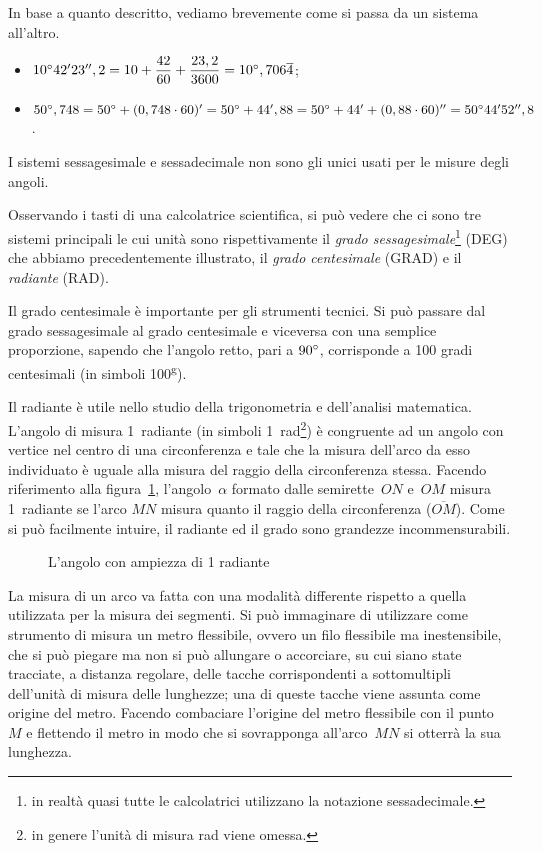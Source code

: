 In base a quanto descritto, vediamo brevemente come si passa da un sistema all'altro.

\begin{itemize}
\item $10{}^{\circ} 42' 23'',2 = 10+\dfrac{42}{60}+\dfrac{23,2}{3600} = 10{}^{\circ},706\overline{4}$;
\item $50{}^{\circ},748 = 50{}^{\circ} + (0,748\cdot 60)'=50{}^{\circ} + 44',88 = 50{}^{\circ} + 44'+(0,88\cdot 60)'' = 50{}^{\circ} 44' 52'',8$.
\end{itemize}

I sistemi sessagesimale e sessadecimale non sono gli unici usati per le misure degli angoli.

Osservando i tasti di una calcolatrice scientifica, si può vedere che ci sono tre sistemi principali le cui unità sono rispettivamente il \emph{grado sessagesimale}\footnote{in realtà quasi tutte le calcolatrici utilizzano la notazione sessadecimale.} (DEG) che abbiamo precedentemente illustrato, il \emph{grado centesimale} (GRAD) e il \emph{radiante} (RAD).

Il grado centesimale è importante per gli strumenti tecnici. Si può passare dal grado sessagesimale al grado centesimale e viceversa con una semplice proporzione, sapendo che l'angolo retto, pari a $90{}^{\circ}$, corrisponde a 100 gradi centesimali (in simboli 100\textsuperscript{g}).

Il radiante è utile nello studio della trigonometria e dell'analisi matematica. L'angolo di misura 1~radiante (in simboli 1~rad\footnote{in genere l'unità di misura rad viene omessa.}) è congruente ad un angolo con vertice nel centro di una circonferenza e tale che la misura dell'arco da esso individuato è uguale alla misura del raggio della circonferenza stessa.
Facendo riferimento alla figura~\ref{fig:radiante}, l'angolo~$\alpha$ formato dalle semirette~$ON$ e~$OM$ misura 1~radiante se l'arco $MN$ misura quanto il raggio della circonferenza ($\overline{OM}$). Come si può facilmente intuire, il radiante ed il grado sono grandezze incommensurabili.

\begin{figure}[htb]
\centering
\caption{L'angolo con ampiezza di 1 radiante}\label{fig:radiante}
\end{figure}

\begin{osservazione}
La misura di un arco va fatta con una modalità differente rispetto a quella utilizzata per la misura dei segmenti. Si può immaginare di utilizzare come strumento di misura un metro flessibile, ovvero un filo flessibile ma inestensibile, che si può piegare ma non si può allungare o accorciare, su cui siano state tracciate, a distanza regolare, delle tacche corrispondenti a sottomultipli dell'unità di misura delle lunghezze; una di queste tacche viene assunta come origine del metro. Facendo combaciare l'origine del metro flessibile con il punto~$M$ e flettendo il metro in modo che si sovrapponga all'arco~$MN$ si otterrà la sua lunghezza.
\end{osservazione}

